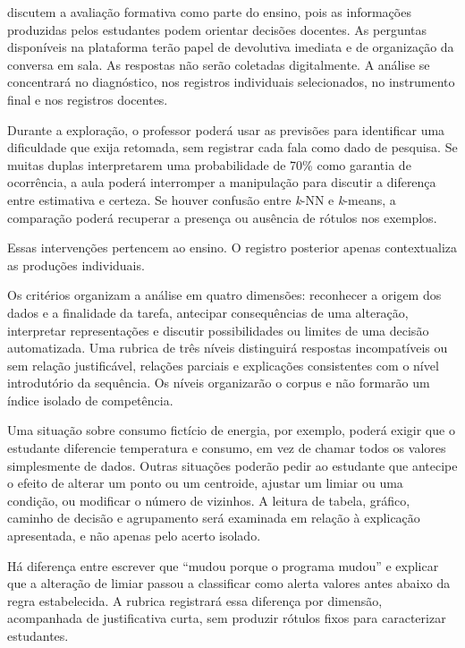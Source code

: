  discutem a avaliação formativa como parte do ensino, pois as informações produzidas pelos estudantes podem orientar decisões docentes. As perguntas disponíveis na plataforma terão papel de devolutiva imediata e de organização da conversa em sala. As respostas não serão coletadas digitalmente. A análise se concentrará no diagnóstico, nos registros individuais selecionados, no instrumento final e nos registros docentes.

Durante a exploração, o professor poderá usar as previsões para identificar uma dificuldade que exija retomada, sem registrar cada fala como dado de pesquisa. Se muitas duplas interpretarem uma probabilidade de 70\% como garantia de ocorrência, a aula poderá interromper a manipulação para discutir a diferença entre estimativa e certeza. Se houver confusão entre \textit{k}-NN e \textit{k}-means, a comparação poderá recuperar a presença ou ausência de rótulos nos exemplos.

Essas intervenções pertencem ao ensino. O registro posterior apenas contextualiza as produções individuais.

Os critérios organizam a análise em quatro dimensões: reconhecer a origem dos dados e a finalidade da tarefa, antecipar consequências de uma alteração, interpretar representações e discutir possibilidades ou limites de uma decisão automatizada. Uma rubrica de três níveis distinguirá respostas incompatíveis ou sem relação justificável, relações parciais e explicações consistentes com o nível introdutório da sequência. Os níveis organizarão o corpus e não formarão um índice isolado de competência.

Uma situação sobre consumo fictício de energia, por exemplo, poderá exigir que o estudante diferencie temperatura e consumo, em vez de chamar todos os valores simplesmente de dados. Outras situações poderão pedir ao estudante que antecipe o efeito de alterar um ponto ou um centroide, ajustar um limiar ou uma condição, ou modificar o número de vizinhos. A leitura de tabela, gráfico, caminho de decisão e agrupamento será examinada em relação à explicação apresentada, e não apenas pelo acerto isolado.

Há diferença entre escrever que ``mudou porque o programa mudou'' e explicar que a alteração de limiar passou a classificar como alerta valores antes abaixo da regra estabelecida. A rubrica registrará essa diferença por dimensão, acompanhada de justificativa curta, sem produzir rótulos fixos para caracterizar estudantes.


